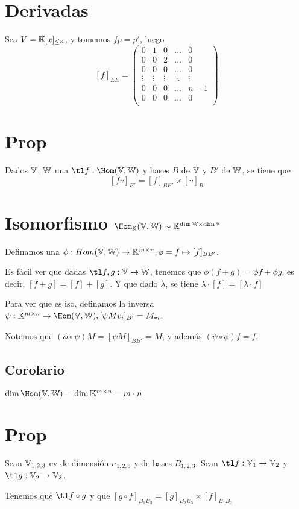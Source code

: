 \documentclass{article}
\begin{document}
\section{Derivadas}
Sea $V = \mathbb{K}[x]_{\leq n}$, y tomemos $fp = p'$, luego
\[
	[f]_{EE} = 
	\begin{pmatrix}
		0 & 1 & 0 & \dots & 0 \\
		0 & 0 & 2 & \dots & 0 \\
		0 & 0 & 0 & \dots & 0 \\
		\vdots & \vdots & \vdots & \ddots & \vdots \\
		0 & 0 & 0 & \dots & n-1 \\
		0 & 0 & 0 & \dots & 0 \\
	\end{pmatrix}
\]

\section{Prop}
Dados $\mathbb{V}$, $\mathbb{W}$ una $\tl f : \Hom(\V, \W)$ y bases $B$ de $\mathbb{V}$ y $B'$ de $\mathbb{W}$,
se tiene que \[[fv]_{B'} = [f]_{BB'} \times [v]_B\]

\section{Isomorfismo $\Hom_\K(\V, \W) \sim \K^{\dim \W \times \dim \V}$}
Definamos una $\phi : Hom(\mathbb{V}, \mathbb{W}) \to \mathbb{K}^{m \times n}, \phi = f \mapsto
[f]_{BB'}$.

Es fácil ver que dadas $\tl f, g : \V \to \W$, tenemos que $\phi (f + g) = \phi f +
\phi g$, es decir, $[f+g] = [f] + [g]$. Y que dado $\lambda$, se tiene
$\lambda \cdot [f] = [\lambda \cdot f]$

Para ver que es iso, definamos la inversa $\psi : \K^{m \times n} \to \Hom(\V,
\W), [\psi M v_i]_{B'} = M_{*i}$.

Notemos que $(\phi \circ \psi) M = [\psi M]_{BB'}= M$, y además $(\psi \circ
\phi) f = f$.

\subsection{Corolario}
$\dim \Hom(\V, \W) = \dim \K^{m \times n} = m \cdot n$

\section{Prop}
Sean $\mathbb{V}_{1,2,3}$ ev de dimensión $n_{1,2,3}$ y de bases $B_{1,2,3}$.
Sean $\tl f : \V_1 \to \V_2$ y $\tl g : \V_2 \to \V_3$.

Tenemos que $\tl f \circ g$ y que $[g \circ f]_{B_1B_3} = [g]_{B_2B_3} \times
[f]_{B_1B_2}$
\end{document}
